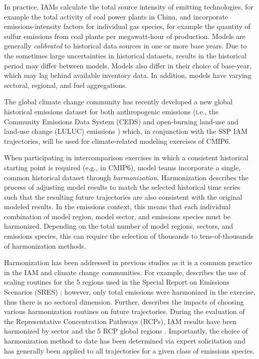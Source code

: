 In practice, IAMs calculate the total source intensity of emitting technologies,
for example the total activity of coal power plants in China, and incorporate
emissions-intensity factors for individual gas species, for example the quantity
of sulfur emissions from coal plants per megawatt-hour of production. Models are generally \textit{calibrated} to historical data sources in one or more base years. Due to the sometimes large uncertainties
in historical datasets, results in the historical period may differ between
models. Models also differ in their choice of base-year, which may lag behind available inventory data. In addition, models have varying sectoral, regional, and fuel aggregations.

The
global climate change community has recently developed a new global historical
emissions dataset for both anthropogenic  emissions (i.e., the Community
Emissions Data System (CEDS) \cite{hoesly_historical_2017} and open-burning land-use and land-use change (LULUC)
emissions \cite{van_marle_historic_2017}) which, in
% 
% 
conjunction with the SSP IAM trajectories, will be used for climate-related
modeling exercises of CMIP6.

When participating in intercomparison exercises in which a consistent historical starting point is required (e.g., in CMIP6), model teams incorporate a
single, common historical dataset through \textit{harmonization}. Harmonization describes the process of
adjusting model results to match the selected historical time series  such that the resulting future trajectories are also consistent with the
original modeled results. In the emissions context, this means that each
individual combination of model region, model sector, and emissions species must
be harmonized. Depending on the total number of model regions, sectors, and
emissions species, this can require the selection of thousands to
tens-of-thousands of harmonization methods.

Harmonization has been addressed in previous studies as it is a common practice
in the IAM and climate change communities. For example,
\cite{meinshausen_rcp_2011} describes the use of scaling routines for the 5
regions used in the Special Report on Emissions Scenarios (SRES)
\cite{nakicenovic2000}; however, only total emissions were harmonized in the
exercise, thus there is no sectoral dimension. Further,
\cite{rogelj_discrepancies_2011} describes the impacts of choosing various
harmonization routines on future trajectories. During the evaluation of the
Representative Concentration Pathways (RCPs), IAM results have been harmonized
by sector and the 5 RCP global regions
\cite{vuuren_representative_2011}. Importantly, the choice of harmonization
method to date has been determined via expert solicitation and has generally
been applied to all trajectories for a given class of emissions species.

